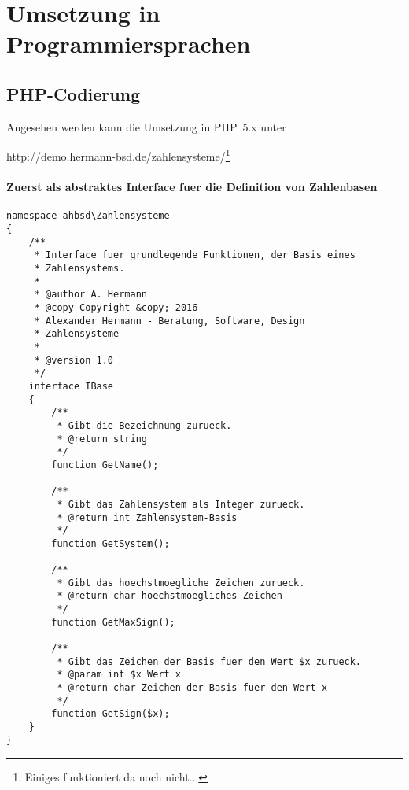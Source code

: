 \chapter{Umsetzung in Programmiersprachen}
\section{PHP-Codierung}
Angesehen werden kann die Umsetzung in PHP~5.x unter 

http://demo.hermann-bsd.de/zahlensysteme/\footnote{Einiges funktioniert da noch nicht...}
\subsubsection{Zuerst als abstraktes Interface fuer die Definition von Zahlenbasen}
\label{listing:PHP:Interface}
\begin{lstlisting}
namespace ahbsd\Zahlensysteme
{
	/**
	 * Interface fuer grundlegende Funktionen, der Basis eines 
	 * Zahlensystems.
	 * 
	 * @author A. Hermann
	 * @copy Copyright &copy; 2016 
	 * Alexander Hermann - Beratung, Software, Design
	 * Zahlensysteme
	 *
	 * @version 1.0
	 */
	interface IBase
	{
		/**
		 * Gibt die Bezeichnung zurueck.
		 * @return string
		 */
		function GetName();
		
		/**
		 * Gibt das Zahlensystem als Integer zurueck.
		 * @return int Zahlensystem-Basis
		 */
		function GetSystem();
		
		/**
		 * Gibt das hoechstmoegliche Zeichen zurueck.
		 * @return char hoechstmoegliches Zeichen
		 */
		function GetMaxSign();
		
		/**
		 * Gibt das Zeichen der Basis fuer den Wert $x zurueck.
		 * @param int $x Wert x
		 * @return char Zeichen der Basis fuer den Wert x
		 */
		function GetSign($x);
	}
}
\end{lstlisting}
